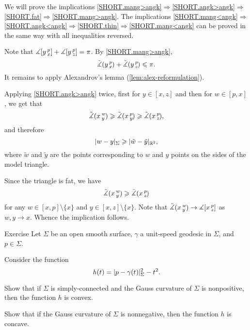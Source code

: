 We will prove the implications \ref{SHORT.mang>angk}$\Rightarrow$\ref{SHORT.angk>angk}$\Rightarrow$\ref{SHORT.fat}$\Rightarrow$\ref{SHORT.mang>angk}.
The implications \ref{SHORT.mang<angk}$\Rightarrow$\ref{SHORT.angk<angk}$\Rightarrow$\ref{SHORT.thin}$\Rightarrow$\ref{SHORT.mang<angk} can be proved in the same way with all inequalities reversed.

Note that $\measuredangle[y\,{}^{p}_{x}]+\measuredangle[y\,{}^{p}_{z}]=\pi$.
By \ref{SHORT.mang>angk}, 
\[\tilde\measuredangle(y\,{}^{p}_{x}\hspace{-0.2ex})+\tilde\measuredangle(y\,{}^{p}_{z}\hspace{-0.2ex})\leqslant \pi.\]
It remains to apply Alexandrov's lemma (\ref{lem:alex-reformulation}).

Applying \ref{SHORT.angk>angk} twice, first for $y\in [x,z]$ and then for $w\in [p,x]$, we get that
\[\tilde\measuredangle(x\,{}^{w}_{y}\hspace{-0.2ex}) \geqslant \tilde\measuredangle(x\,{}^{p}_{y}\hspace{-0.2ex}) \geqslant \tilde\measuredangle(x\,{}^{p}_{z}\hspace{-0.2ex}),\]
and therefore
\[\dist{w}{y}\Sigma\ge \dist{\tilde w}{\tilde y}{\mathbb{R}^2},\]
where $\tilde w$ and $\tilde y$ are the points corresponding to $w$ and $y$ points on the sides of the model triangle. 

Since the triangle is fat, we have 
\[\tilde\measuredangle(x\,{}^{w}_{y}\hspace{-0.2ex}) \geqslant \tilde\measuredangle(x\,{}^{p}_{z}\hspace{-0.2ex})\]
for any $w\in [x,p]\setminus \{x\}$ and $y\in [x,z]\setminus \{x\}$.
Note that $\tilde\measuredangle(x\,{}^{w}_{y}\hspace{-0.2ex})\to \measuredangle[x\,{}^{p}_{z}]$ as $w,y\to x$.
Whence the implication follows.
\qeds

\begin{thm}{Exercise}\label{ex:geod-convexity}
Let $\Sigma$ be an open smooth surface, 
 $\gamma$ a unit-speed geodesic in $\Sigma$, and $p\in\Sigma$.

Consider the function
\[h(t)=\dist{p}{\gamma(t)}\Sigma^2-t^2.\]

\begin{subthm}{}
Show that if $\Sigma$ is simply-connected and the Gauss curvature of $\Sigma$ is nonpositive, then the function $h$ is convex.
\end{subthm}

\begin{subthm}{} Show that if the Gauss curvature of $\Sigma$ is nonnegative, then the function $h$ is concave.
\end{subthm}

\end{thm}

